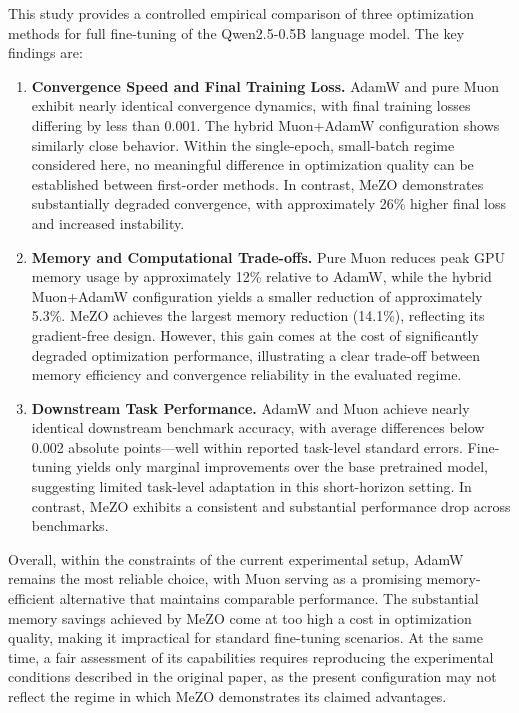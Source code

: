 \documentclass{article}
\begin{document}
This study provides a controlled empirical comparison of three optimization methods for full fine-tuning of the Qwen2.5-0.5B language model. The key findings are:

\begin{enumerate}
    \item \textbf{Convergence Speed and Final Training Loss.}  
    AdamW and pure Muon exhibit nearly identical convergence dynamics, with final training losses differing by less than 0.001. The hybrid Muon+AdamW configuration shows similarly close behavior. Within the single-epoch, small-batch regime considered here, no meaningful difference in optimization quality can be established between first-order methods. In contrast, MeZO demonstrates substantially degraded convergence, with approximately 26\% higher final loss and increased instability.
    
    \item \textbf{Memory and Computational Trade-offs.}  
    Pure Muon reduces peak GPU memory usage by approximately 12\% relative to AdamW, while the hybrid Muon+AdamW configuration yields a smaller reduction of approximately 5.3\%. MeZO achieves the largest memory reduction (14.1\%), reflecting its gradient-free design. However, this gain comes at the cost of significantly degraded optimization performance, illustrating a clear trade-off between memory efficiency and convergence reliability in the evaluated regime.

    \item \textbf{Downstream Task Performance.}  
    AdamW and Muon achieve nearly identical downstream benchmark accuracy, with average differences below 0.002 absolute points—well within reported task-level standard errors. Fine-tuning yields only marginal improvements over the base pretrained model, suggesting limited task-level adaptation in this short-horizon setting. In contrast, MeZO exhibits a consistent and substantial performance drop across benchmarks.
\end{enumerate}

Overall, within the constraints of the current experimental setup, AdamW remains the most reliable choice, with Muon serving as a promising memory-efficient alternative that maintains comparable performance. The substantial memory savings achieved by MeZO come at too high a cost in optimization quality, making it impractical for standard fine-tuning scenarios. At the same time, a fair assessment of its capabilities requires reproducing the experimental conditions described in the original paper, as the present configuration may not reflect the regime in which MeZO demonstrates its claimed advantages.
\end{document}
